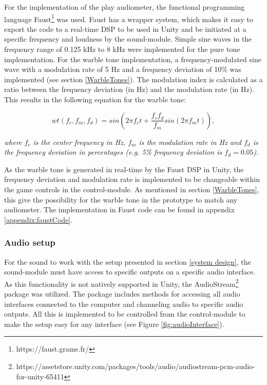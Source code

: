 For the implementation of the play audiometer, the functional programming language Faust\footnote{https://faust.grame.fr/} was used. Faust has a wrapper system, which makes it easy to export the code to a real-time DSP to be used in Unity and be initiated at a specific frequency and loudness by the sound-module. Simple sine waves in the frequency range of 0.125 kHz to 8 kHz were implemented for the pure tone implementation. For the warble tone implementation, a frequency-modulated sine wave with a modulation rate of 5 Hz and a frequency deviation of 10\% was implemented (see section \ref{WarbleTones}). The modulation index is calculated as a ratio between the frequency deviation (in Hz) and the modulation rate (in Hz). This results in the following equation for the warble tone: 

\begin{equation}
    wt(f_{c},f_{m},f_{d}) = sin(2\pi f_{c}t+\frac{f_{c}f_{d}}{f_{m}}sin(2\pi f_{m}t)),
\end{equation}
\begin{footnotesize}
\textit{where $f_{c}$ is the center frequency in Hz, $f_{m}$ is the modulation rate in Hz and $f_{d}$ is the frequency deviation in percentages (e.g. 5\% frequency deviation is $f_{d} = 0.05$). }
\end{footnotesize} \newline


As the warble tone is generated in real-time by the Faust DSP in Unity, the frequency deviation and modulation rate is implemented to be changeable within the game controls in the control-module. As mentioned in section \ref{WarbleTones}, this give the possibility for the warble tone in the prototype to match any audiometer. The implementation in Faust code can be found in appendix \ref{appendix:faustCode}.


\subsubsection{Audio setup}

For the sound to work with the setup presented in section \ref{system design}, the sound-module must have access to specific outputs on a specific audio interface. As this functionality is not natively supported in Unity, the AudioStream\footnote{https://assetstore.unity.com/packages/tools/audio/audiostream-pcm-audio-for-unity-65411} package was utilized. The package includes methods for accessing all audio interfaces connected to the computer and channeling audio to specific audio outputs. All this is implemented to be controlled from the control-module to make the setup easy for any interface (see Figure \ref{fig:audioInterface}). 

